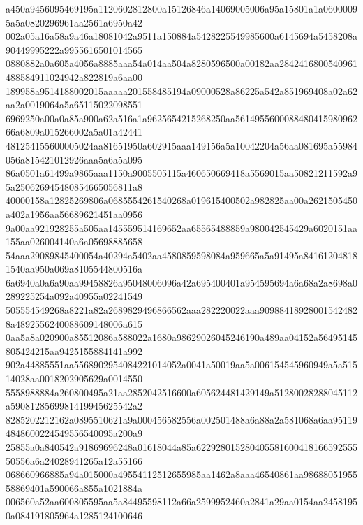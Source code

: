 \documentclass[10pt,letterpaper]{article}
\newenvironment{hexcertificate}{\par\begingroup\ttfamily\scriptsize\raggedright\setlength{\parskip}{0pt}\noindent}{\par\endgroup}
\begin{document}
\begin{hexcertificate}
a450a9456095469195a1120602812800a15126846a14069005006a95a15801a1a06000095a5a0820296961aa2561a6950a42\\
002a05a16a58a9a46a18081042a9511a150884a5428225549985600a6145694a5458208a90449995222a9955616501014565\\
0880882a0a605a4056a8885aaa54a014aa504a8280596500a00182aa2842416800540961488584911024942a822819a6aa00\\
189958a9514188002015aaaaa201558485194a09000528a86225a542a851969408a02a62aa2a0019064a5a65115022098551\\
6969250a00a0a85a900a62a516a1a9625654215268250aa561495560008848041598096266a6809a015266002a5a01a42441\\
481254155600005024aa81651950a602915aaa149156a5a10042204a56aa081695a55984056a815421012926aaa5a6a5a095\\
86a0501a61499a9865aaa1150a9005505115a460650669418a5569015aa50821211592a95a250626945480854665056811a8\\
40000158a12825269806a0685554261540268a019615400502a982825aa00a2621505450a402a1956aa56689621451aa0956\\
9a00aa921928255a505aa145559514169652aa65565488859a980042545429a6020151aa155aa026004140a6a05698885658\\
54aaa29089845400054a40294a5402aa4580859598084a959665a5a91495a841612048181540aa950a069a8105544800516a\\
6a6940a0a6a90aa99458826a95048006096a42a695400401a954595694a6a68a2a8698a0289225254a092a40955a02241549\\
505554549268a8221a82a2689829496866562aaa282220022aaa909884189280015424828a4892556240088609148006a615\\
0aa5a8a020900a85512086a588022a1680a98629026045246190a489aa04152a56495145805424215aa9425155884141a992\\
902a44885551aa5568902954084221014052a0041a50019aa5a006154545960949a5a51514028aa0018202905629a0014550\\
5558988884a260800495a21aa2852042516600a605624481429149a51280028288045112a5908128569981419945625542a2\\
8285202212162a0895510621a9a000456582556a002501488a6a88a2a581068a6aa951194848600224549556540095a200a9\\
25855a0a840542a91869696248a01618044a85a62292801528040558160041816659255550556a6a24028941265a12a55166\\
068660966885a94a015000a49554112512655985aa1462a8aaa46540861aa9868805195558869401a590066a855a1021884a\\
006560a52aa600805595aa5a84495598112a66a2599952460a2841a29aa0154aa24581950a084191805964a1285124100646\\

\end{hexcertificate}
\end{document}
